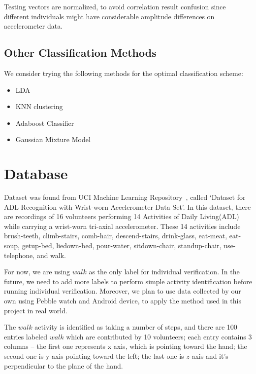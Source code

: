 \documentclass[10pt,twocolumn,letterpaper]{article}
\begin{document}
Testing vectors are normalized, to avoid correlation result confusion since different individuals might have considerable amplitude differences on accelerometer data.

\subsection{Other Classification Methods}

We consider trying the following methods for the optimal classification scheme:
\begin{itemize}
\item LDA
\item KNN clustering
\item Adaboost Classifier
\item Gaussian Mixture Model

\end{itemize}

\section{Database}

Dataset was found from UCI Machine Learning Repository~\cite{Author02}, called ‘Dataset for ADL Recognition with Wrist-worn Accelerometer Data Set’. In this dataset, there are recordings of 16 volunteers performing 14 Activities of Daily Living(ADL) while carrying a wrist-worn tri-axial accelerometer. These 14 activities include brush-teeth, climb-stairs, comb-hair, descend-stairs, drink-glass, eat-meat, eat-soup, getup-bed, liedown-bed, pour-water, sitdown-chair, standup-chair, use-telephone, and walk.

For now, we are using $walk$ as the only label for individual verification. In the future, we need to add more labels to perform simple activity identification before running individual verification. Moreover, we plan to use data collected by our own using Pebble watch and Android device, to apply the method used in this project in real world.

The $walk$ activity is identified as taking a number of steps, and there are 100 entries labeled $walk$ which are contributed by 10 volunteers; each entry contains 3 columns -- the first one represents x axis, which is pointing toward the hand; the second one is y axis pointing toward the left; the last one is $z$ axis and it’s perpendicular to the plane of the hand.
\end{document}
